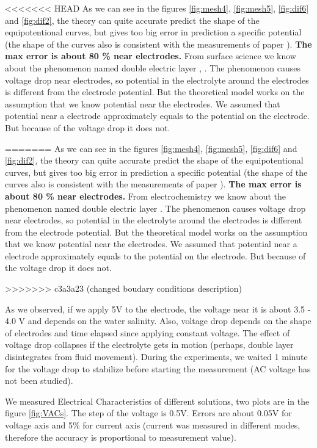 \documentclass{article}
\begin{document}
<<<<<<< HEAD
As we can see in the figures \ref{fig:mesh4}, \ref{fig:mesh5}, \ref{fig:dif6} and \ref{fig:dif2}, the theory can quite accurate predict the shape of the equipotentional curves, but gives too big error in prediction a specific potential (the shape of the curves also is consistent with the measurements of paper \cite{binder2015high}). \textbf{The max error is about 80 \% near electrodes.} From surface science we know about the phenomenon named double electric layer \cite{kinetika}, \cite{stillinger}. The phenomenon causes voltage drop near electrodes, so potential in the electrolyte around the electrodes is different from the electrode potential. But the theoretical model works on the assumption that we know potential near the electrodes. We assumed that potential near a electrode approximately equals to the potential on the electrode. But because of the voltage drop it does not. \par
=======
As we can see in the figures \ref{fig:mesh4}, \ref{fig:mesh5}, \ref{fig:dif6} and \ref{fig:dif2}, the theory can quite accurate predict the shape of the equipotentional curves, but gives too big error in prediction a specific potential (the shape of the curves also is consistent with the measurements of paper \cite{binder2015high}). \textbf{The max error is about 80 \% near electrodes.} From electrochemistry we know about the phenomenon named double electric layer \cite{kinetika}. The phenomenon causes voltage drop near electrodes, so potential in the electrolyte around the electrodes is different from the electrode potential. But the theoretical model works on the assumption that we know potential near the electrodes. We assumed that potential near a electrode approximately equals to the potential on the electrode. But because of the voltage drop it does not. \par
>>>>>>> c3a3a23 (changed boudary conditions description)

As we observed, if we apply 5V to the electrode, the voltage near it is about 3.5 - 4.0 V and depends on the water salinity. Also, voltage drop depends on the shape of electrodes and time elapsed since applying constant voltage. The effect of voltage drop collapses if the electrolyte gets in motion (perhaps, double layer disintegrates from fluid movement). During the experiments, we waited 1 minute for the voltage drop to stabilize before starting the measurement (AC voltage has not been studied).\par

We measured Electrical Characteristics of different solutions, two plots are in the figure \ref{fig:VACs}. The step of the voltage is 0.5V. Errors are about 0.05V for voltage axis and 5\% for current axis (current was measured in different modes, therefore the accuracy is proportional to measurement value).
\end{document}
